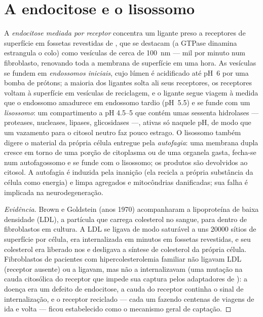 \section{A endocitose e o lisossomo}

\begin{definition}[Endocitose]\label{def:b3:membrane-traffic:endocytosis}
A \emph{endocitose mediada por receptor} concentra um ligante preso a
receptores de superfície em fossetas revestidas de , que se
destacam (a GTPase dinamina estrangula o colo) como vesículas de cerca
de \qty{100}{nm} --- mil por minuto num fibroblasto, renovando toda a
membrana de superfície em uma hora. As vesículas se fundem em
\emph{endossomos iniciais}, cujo lúmen é acidificado até pH~6 por uma
bomba de prótons; a maioria dos ligantes solta ali seus receptores, os
receptores voltam à superfície em vesículas de reciclagem, e o ligante
segue viagem à medida que o endossomo amadurece em endossomo tardio
(pH~5.5) e se funde com um \emph{lisossomo}: um compartimento a pH
4.5--5 que contém umas sessenta hidrolases --- proteases, nucleases,
lipases, glicosidases ---, ativas só naquele pH, de modo que um
vazamento para o citosol neutro faz pouco estrago. O lisossomo também
digere o material da própria célula entregue pela \emph{autofagia}: uma
membrana dupla cresce em torno de uma porção de citoplasma ou de uma
organela gasta, fecha-se num autofagossomo e se funde com o lisossomo;
os produtos são devolvidos ao citosol. A autofagia é induzida pela
inanição (ela recicla a própria substância da célula como energia) e
limpa agregados e mitocôndrias danificadas; sua falha é implicada na
neurodegeneração.
\end{definition}

\begin{proof}[Evidência]
Brown e Goldstein (anos 1970) acompanharam a lipoproteína de baixa
densidade (LDL), a partícula que carrega colesterol no sangue, para
dentro de fibroblastos em cultura. A LDL se ligava de modo saturável a
uns \num{20000} sítios de superfície por célula, era internalizada em
minutos em fossetas revestidas, e seu colesterol era liberado nos
 e desligava a síntese de colesterol da própria célula.
Fibroblastos de pacientes com hipercolesterolemia familiar não ligavam
LDL (receptor ausente) ou a ligavam, mas não a internalizavam (uma
mutação na cauda citosólica do receptor que impede sua captura pelos
adaptadores de ): a doença era um defeito de endocitose, a
cauda do receptor continha o sinal de internalização, e o receptor
reciclado --- cada um fazendo centenas de viagens de ida e volta ---
ficou estabelecido como o mecanismo geral de captação.
\end{proof}

